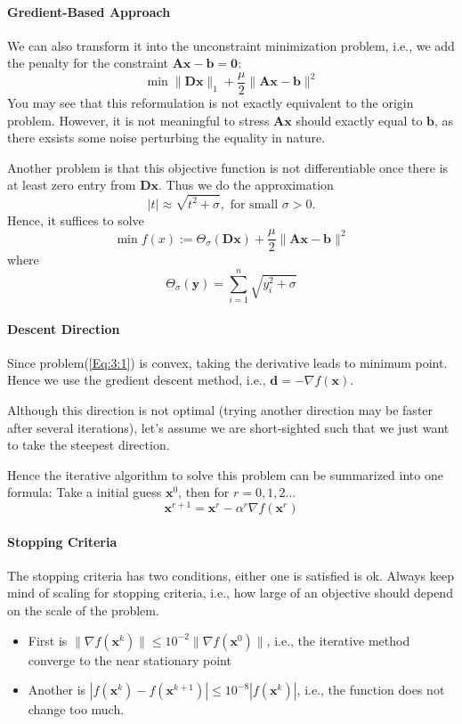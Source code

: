 \paragraph{Gredient-Based Approach}
We can also transform it into the unconstraint minimization problem, i.e., we add the penalty for the constraint $\bm{Ax} - \bm b=\bm0$:
\[
\min\|\bm D\bm x\|_1 + \frac{\mu}{2}\|\bm{Ax} - \bm b\|^2
\]
You may see that this reformulation is not exactly equivalent to the origin problem. However, it is not meaningful to stress $\bm{Ax}$ should exactly equal to $\bm b$, as there exsists some noise perturbing the equality in nature.

Another problem is that this objective function is not differentiable once there is at least zero entry from $\bm{Dx}$. Thus we do the approximation
\[
|t| \approx \sqrt{t^2+\sigma},\mbox{ for small }\sigma>0.
\]
Hence, it suffices to solve
\begin{equation}\label{Eq:3:1}
\min f(x):=\Theta_{\sigma}(\bm{Dx}) + \frac{\mu}{2}\|\bm{Ax} - \bm b\|^2
\end{equation}
where
\[
\Theta_{\sigma}(\bm y) = \sum_{i=1}^n\sqrt{y_i^2+\sigma}
\]

\paragraph{Descent Direction}
Since problem(\ref{Eq:3:1}) is convex, taking the derivative leads to minimum point. Hence we use the gredient descent method, i.e., $\bm d = -\nabla f(\bm x)$.

Although this direction is not optimal (trying another direction may be faster after several iterations), let's assume we are short-sighted such that we just want to take the steepest direction.

Hence the iterative algorithm to solve this problem can be summarized into one formula: Take a initial guess $\bm x^0$, then for $r=0,1,2\dots$
\[
\bm x^{r+1} = \bm x^r - \alpha^r\nabla f(\bm x^r)
\]
\paragraph{Stopping Criteria}
The stopping criteria has two conditions, either one is satisfied is ok. Always keep mind of scaling for stopping criteria, i.e., how large of an objective should depend on the scale of the problem.
\begin{itemize}
\item
First is $\|\nabla f(\bm x^k)\|\le 10^{-2}\|\nabla f(\bm x^0)\|$, i.e., the iterative method converge to the near stationary point
\item
Another is $|f(\bm x^k) - f(\bm x^{k+1})|\le 10^{-8}|f(\bm x^k)|$, i.e., the function does not change too much.
\end{itemize}

